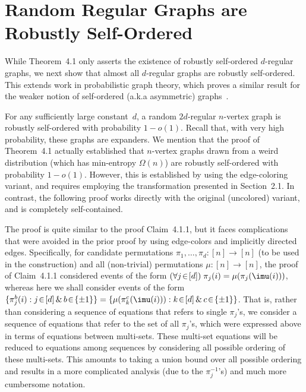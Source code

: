 \setcounter{section}{5}\section{Random Regular Graphs are Robustly Self-Ordered}
%
\label{random-graphs:sec}
While Theorem~4.1 only asserts the
existence of robustly self-ordered $d$-regular graphs,
we next show that almost all $d$-regular graphs
are robustly self-ordered.
This extends work in probabilistic graph theory,
which proves a similar result for the weaker notion
of self-ordered (a.k.a asymmetric) graphs~\cite{B1,B2}.
%
%
%
%

\label{random-works:thm}
For any sufficiently large constant~$d$,
a random $2d$-regular $n$-vertex graph
is robustly self-ordered with probability $1-o(1)$.
%
%
\ET
Recall that, with very high probability, these graphs are expanders.
%
We mention that the proof of Theorem~4.1
actually established that $n$-vertex graphs drawn from
a weird distribution (which has min-entropy $\Omega(n)$)
are robustly self-ordered with probability $1-o(1)$.
However, this is established by using the edge-coloring variant,
and requires employing the transformation presented
in Section~2.1.
In contrast, the following proof works directly with the original
(uncolored) variant, and is completely self-contained.
\medskip
%
%
%

\BPF
The proof is quite similar to the proof Claim~4.1.1,
but it faces complications that were avoided in the prior proof
by using edge-colors and implicitly directed edges.
Specifically, for candidate permutations $\pi_1,\ldots,\pi_d:[n]\to[n]$
(to be used in the construction)
and all (non-trivial) permutations $\mu:[n]\to[n]$,
the proof of Claim~4.1.1 considered events
of the form $(\forall j\!\in\![d])\;\pi_j(i)=\mu(\pi_j(\imu(i)))$,
whereas here we shall consider events of the form
$\{\pi^b_j(i):j\!\in\![d]\,\&\,b\!\in\!\{\pm1\}\}
 =\{\mu(\pi_k^c(\imu(i))):k\!\in\![d]\,\&\,c\!\in\!\{\pm1\}\}$.
That is, rather than considering a sequence of equations that
refers to single $\pi_j$'s, we consider a sequence of equations
that refer to the set of all $\pi_j$'s, which were expressed
above in terms of equations between multi-sets.
These multi-set equations will be reduced to equations among sequences
by considering all possible ordering of these multi-sets.
This amounts to taking a union bound over all possible ordering
and results in a more complicated analysis (due to the $\pi_j^{-1}$'s)
and much more cumbersome notation.

